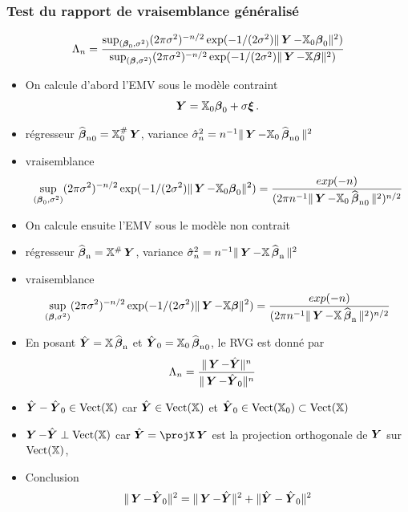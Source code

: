 \begin{frame}
\frametitle{Test du rapport de vraisemblance généralisé}
\[
\Lambda_n = \frac{\sup_{(\truebeta_0,\sigma^2)} (2 \pi \sigma^2)^{-n/2} \exp(-1/(2\sigma^2) \| \bY - \regressmat_0 \truebeta_0\|^2)}{\sup_{(\truebeta,\sigma^2)} (2 \pi \sigma^2)^{-n/2} \exp(-1/(2\sigma^2) \| \bY - \regressmat \truebeta\|^2)}
\]
{
\begin{itemize}
\item On calcule d'abord l'EMV sous le modèle contraint
\[
\bY = \regressmat_0 \truebeta_0 + \sigma \bnoise \eqsp.
\]
\item \alert{régresseur} $\estregress_0= \regressmat_0^{\#} \bY$, \alert{variance} $\hat{\sigma}_n^2= n^{-1} \| \bY - \regressmat_0 \estregress_0\|^2$
\item \alert{vraisemblance}
\[
\sup_{(\truebeta_0,\sigma^2)} (2 \pi \sigma^2)^{-n/2} \exp(-1/(2\sigma^2) \| \bY - \regressmat_0 \truebeta_0\|^2)
= \frac{exp(-n)}{(2 \pi n^{-1} \| \bY - \regressmat_0 \estregress_0\|^2)^{n/2}}
\]
\end{itemize}
}
{
\begin{itemize}
\item On calcule ensuite l'EMV sous le modèle non contrait
\item \alert{régresseur} $\estregress= \regressmat^{\#} \bY$, \alert{variance} $\hat{\sigma}_n^2= n^{-1} \| \bY - \regressmat \estregress\|^2$
\item \alert{vraisemblance}
\[
\sup_{(\truebeta,\sigma^2)} (2 \pi \sigma^2)^{-n/2} \exp(-1/(2\sigma^2) \| \bY - \regressmat \truebeta\|^2)
= \frac{exp(-n)}{(2 \pi n^{-1} \| \bY - \regressmat \estregress \|^2)^{n/2}}
\]
\end{itemize}
}
{
\begin{itemize}
\item En posant $\predY= \regressmat \estregress$ et $\predY_0= \regressmat_0 \estregress_0$, le RVG est donné par
\begin{align*}
\Lambda_n &= \frac{\| \bY - \predY \|^n}{\| \bY - \predY_0 \|^n}
\end{align*}
\item $\predY - \predY_0 \in \vect(\regressmat)$ car $\predY \in \vect(\regressmat)$ et $\predY_0 \in \vect(\regressmat_0) \subset \vect(\regressmat)$
\item $\bY - \predY \perp \vect(\regressmat)$ car $\predY= \projX \bY$ est la projection orthogonale de $\bY$ sur $\vect(\regressmat)$,
\item \alert{Conclusion}
\[
\| \bY - \predY_0 \|^2 = \|\bY - \predY \|^2 + \| \predY - \predY_0 \|^2
\]
\end{itemize}
}
\end{frame}

